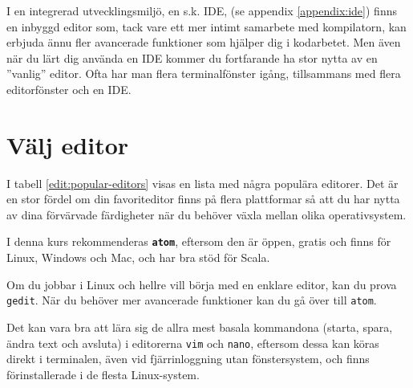 I en integrerad utvecklingsmiljö, en s.k. IDE, (se appendix \ref{appendix:ide}) finns en inbyggd editor som, tack vare ett mer intimt samarbete med kompilatorn, kan erbjuda ännu fler avancerade funktioner som hjälper dig i kodarbetet. Men även när du lärt dig använda en IDE kommer du fortfarande ha stor nytta av en ''vanlig'' editor. Ofta har man flera terminalfönster igång, tillsammans med flera editorfönster och en IDE. 

\section{Välj editor}

I tabell \ref{edit:popular-editors} visas en lista med några populära editorer. Det är en stor fördel om din favoriteditor finns på flera plattformar så att du har nytta av dina förvärvade färdigheter när du behöver växla mellan olika operativsystem. 

I denna kurs rekommenderas \textbf{\texttt{atom}}, eftersom den är öppen, gratis och finns för Linux, Windows och Mac, och har bra stöd för Scala. 

Om du jobbar i Linux och hellre vill börja med en enklare editor, kan du prova \texttt{gedit}. När du behöver mer avancerade funktioner kan du gå över till \texttt{atom}. 

Det kan vara bra att lära sig de allra mest basala kommandona (starta, spara, ändra text och avsluta) i editorerna \texttt{vim} och \texttt{nano}, eftersom dessa kan köras direkt i terminalen, även vid fjärrinloggning utan fönstersystem, och finns förinstallerade i de flesta Linux-system.


